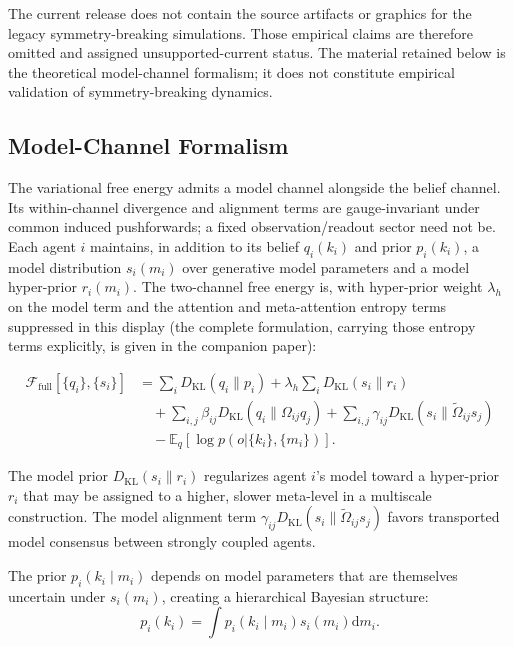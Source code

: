 \documentclass[twoside,11pt]{article}
\begin{document}
The current release does not contain the source artifacts or graphics for the legacy symmetry-breaking simulations. Those empirical claims are therefore omitted and assigned unsupported-current status. The material retained below is the theoretical model-channel formalism; it does not constitute empirical validation of symmetry-breaking dynamics.


\subsection{Model-Channel Formalism}
\label{app:model_channel_supp}

The variational free energy admits a model channel alongside the belief channel. Its within-channel divergence and alignment terms are gauge-invariant under common induced pushforwards; a fixed observation/readout sector need not be. Each agent $i$ maintains, in addition to its belief $q_i(k_i)$ and prior $p_i(k_i)$, a model distribution $s_i(m_i)$ over generative model parameters and a model hyper-prior $r_i(m_i)$. The two-channel free energy is, with hyper-prior weight $\lambda_h$ on the model term and the attention and meta-attention entropy terms suppressed in this display (the complete formulation, carrying those entropy terms explicitly, is given in the companion paper):

\begin{equation}
\begin{aligned}
\mathcal{F}_{\text{full}}[\{q_i\},\{s_i\}]
&=\sum_i D_{\mathrm{KL}}(q_i \| p_i)
+\lambda_h\sum_i D_{\mathrm{KL}}(s_i \| r_i)\\
&\quad+\sum_{i,j}\beta_{ij} D_{\mathrm{KL}}(q_i \| \Omega_{ij}q_j)
+\sum_{i,j}\gamma_{ij} D_{\mathrm{KL}}(s_i \| \tilde{\Omega}_{ij}s_j)\\
&\quad-\mathbb{E}_q[\log p(o |\{k_i\},\{m_i\})].
\end{aligned}
\label{eq:free_energy_full_supp}
\end{equation}

The model prior $D_{\mathrm{KL}}(s_i \| r_i)$ regularizes agent $i$'s model toward a hyper-prior $r_i$ that may be assigned to a higher, slower meta-level in a multiscale construction. The model alignment term $\gamma_{ij} D_{\mathrm{KL}}(s_i \| \tilde{\Omega}_{ij} s_j)$ favors transported model consensus between strongly coupled agents.

The prior $p_i(k_i \mid m_i)$ depends on model parameters that are themselves uncertain under $s_i(m_i)$, creating a hierarchical Bayesian structure:
\begin{equation}
p_i(k_i) = \int p_i(k_i \mid m_i) s_i(m_i) \mathrm{d}m_i.
\end{equation}
\end{document}
